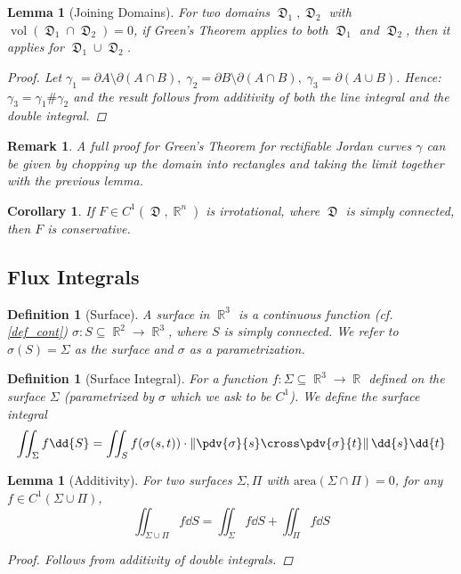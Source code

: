 \documentclass[12pt]{article}
\DeclareMathOperator{\R}{\mathbb{R}}
\DeclareMathOperator{\D}{\mathfrak{D}}
\DeclareMathOperator{\vol}{vol}
\newtheorem{definition}[theorem]{Definition}
\newtheorem{lemma}[theorem]{Lemma}
\newtheorem{corollary}[theorem]{Corollary}
\newtheorem{remark}[theorem]{Remark}
\begin{document}
\begin{lemma}[Joining Domains]
  For two domains $\D_1,\D_2$ with $\vol(\D_1\cap\D_2)=0$, if Green's Theorem applies to both $\D_1$ and $\D_2$, then it applies for $\D_1\cup\D_2$.
  \begin{proof}
    Let $\gamma_1=\partial A\setminus\partial(A\cap B),\;\gamma_2=\partial B\setminus\partial(A\cap B),\;\gamma_3=\partial(A\cup B)$. Hence: $\gamma_3=\gamma_1\#\gamma_2$ and the result follows from additivity of both the line integral and the double integral.
  \end{proof}
\end{lemma}

\begin{remark}
  A full proof for Green's Theorem for rectifiable Jordan curves $\gamma$ can be given by chopping up the domain into rectangles and taking the limit together with the previous lemma.
\end{remark}

\begin{corollary}
  If $F\in C^1(\D,\R^n)$ is irrotational, where $\D$ is simply connected, then $F$ is conservative.
\end{corollary}

\pagebreak

\subsection{Flux Integrals}

\begin{definition}[Surface]
  \label{def_surface}
  A surface in $\R^3$ is a continuous function (cf. \ref{def_cont}) $\sigma:S\subseteq\R^2\to \R^3$, where $S$ is simply connected. We refer to $\sigma(S)=\Sigma$ as the surface and $\sigma$ as a parametrization.
\end{definition}

\begin{definition}[Surface Integral]
  For a function $f:\Sigma\subseteq\R^3\to\R$ defined on the surface $\Sigma$ (parametrized by $\sigma$ which we ask to be $C^1$). We define the surface integral $$\iint_{\Sigma}f\dd{S}=\iint_S f(\sigma(s,t))\cdot\left\|\pdv{\sigma}{s}\cross\pdv{\sigma}{t}\right\|\dd{s}\dd{t}$$
\end{definition}

\begin{lemma}[Additivity]
  \label{surf_additivity}
  For two surfaces $\Sigma,\Pi$ with $\text{area}(\Sigma\cap\Pi)=0$, for any $f\in C^1(\Sigma\cup\Pi)$, $$\iint_{\Sigma\cup\Pi} f\dd{S}=\iint_{\Sigma}f\dd{S}+\iint_{\Pi} f\dd{S}$$
  \begin{proof}
    Follows from additivity of double integrals.
  \end{proof}
\end{lemma}
\end{document}
